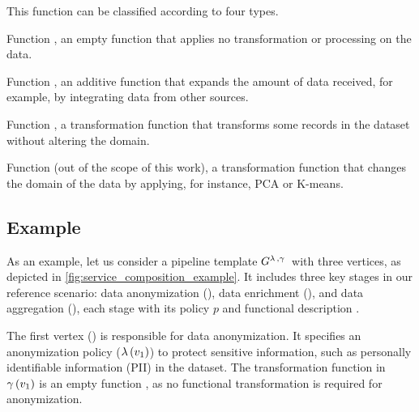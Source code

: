This function can be classified according to four types.
\begin{enumerate*}[label=\roman*)]
  \item Function \TF{\epsilon}, an empty function that applies no transformation or processing on the data.
  \item Function , an additive function that expands the amount of data received, for example, by integrating data from other sources.
  \item Function , a transformation function that transforms some records in the dataset without altering the domain.
  \item Function  (out of the scope of this work), a transformation function that changes the domain of the data by applying, for instance, PCA or K-means.
\end{enumerate*}

\subsection{Example}\label{sec:example}
As an example, let us consider a pipeline template $G^{\lambda\,,\gamma\,}$ with three vertices, as depicted in \cref{fig:service_composition_example}.
It includes three key stages in our reference scenario: data anonymization (), data enrichment (), and data aggregation (), each stage with its policy $p$ and functional description \F.

The first vertex () is responsible for data anonymization.
It specifies an anonymization policy ($\lambda\,(v_1)$) to protect sensitive information, such as personally identifiable information (PII) in the dataset.
The transformation function  in $\gamma\,(v_1)$ is an empty function , as no functional transformation is required for anonymization.

